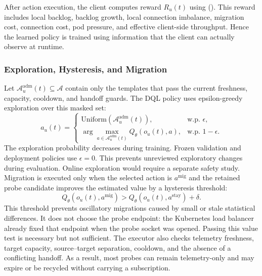 After action execution, the client computes reward $R_u(t)$ using
(). This reward includes local backlog, backlog
growth, local connection imbalance, migration cost, connection cost, pod
pressure, and effective client-side throughput. Hence the learned policy is
trained using information that the client can actually observe at runtime.

\subsubsection{Exploration, Hysteresis, and Migration}

Let $\mathcal{A}^{\mathrm{adm}}_u(t)\subseteq\mathcal{A}$ contain only the templates
that pass the current freshness, capacity, cooldown, and handoff guards. The
DQL policy uses epsilon-greedy exploration over this masked set:
\begin{equation}
	a_u(t)=
	\begin{cases}
		\text{Uniform}(\mathcal{A}^{\mathrm{adm}}_u(t)), & \text{w.p. } \epsilon,\\
		\arg\max_{a\in\mathcal{A}^{\mathrm{adm}}_u(t)} Q_\theta(o_u(t),a), & \text{w.p. } 1-\epsilon.
	\end{cases}
\end{equation}
The exploration probability decreases during training. Frozen validation and
deployment policies use $\epsilon=0$. This prevents unreviewed exploratory
changes during evaluation. Online exploration would require a separate
safety study. Migration is
executed only when the selected action is $a^{\mathrm{mig}}$ and the retained probe
candidate improves the estimated value by a hysteresis threshold:
\begin{equation}
	Q_\theta(o_u(t),a^{\mathrm{mig}}) >
	Q_\theta(o_u(t),a^{\mathrm{stay}})+\delta.
\end{equation}
This threshold prevents oscillatory migrations caused by small or stale
statistical differences. It does not choose the probe endpoint: the Kubernetes
load balancer already fixed that endpoint when the probe socket was opened.
Passing this value test is necessary but not sufficient. The executor also
checks telemetry freshness, target capacity, source--target separation, cooldown,
and the absence of a conflicting handoff. As a result, most probes
can remain telemetry-only and may expire or be recycled without carrying a
subscription.

